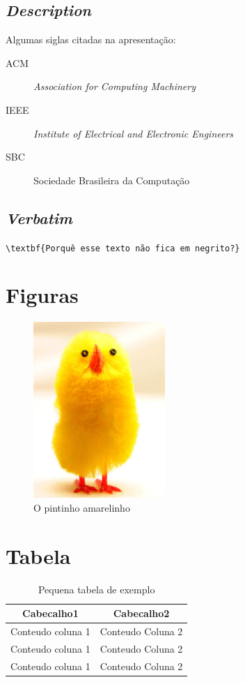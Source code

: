 \documentclass{article}
\begin{document}
		\subsection{\textit{Description}}
			Algumas siglas citadas na apresentação:
			\begin{description}
				\item[ACM] \textit{Association for Computing Machinery}
				\item[IEEE]	\textit{Institute of Electrical and Electronic Engineers}
				\item[SBC] Sociedade Brasileira da Computação
			\end{description}

		\subsection{\textit{Verbatim}}
			\label{verbatim}\verb|\textbf{Porquê esse texto não fica em negrito?}|
	
	\section{Figuras}
		\begin{figure}[h]
			\centering
			\label{pinto}
			\includegraphics{chick.png}
			\caption{O pintinho amarelinho}
		\end{figure}
	
	\section{Tabela}
		\begin{table}[h]
			\centering
			\begin{tabular}{c|c}
				\hline	Cabecalho1			&	Cabecalho2	\\
				\hline	Conteudo coluna 1	&	Conteudo Coluna 2	\\
				\hline	Conteudo coluna 1	&	Conteudo Coluna 2	\\
				\hline	Conteudo coluna 1	&	Conteudo Coluna 2	\\
				\hline
			\end{tabular}
			\caption{Pequena tabela de exemplo}
		\end{table}
\end{document}
